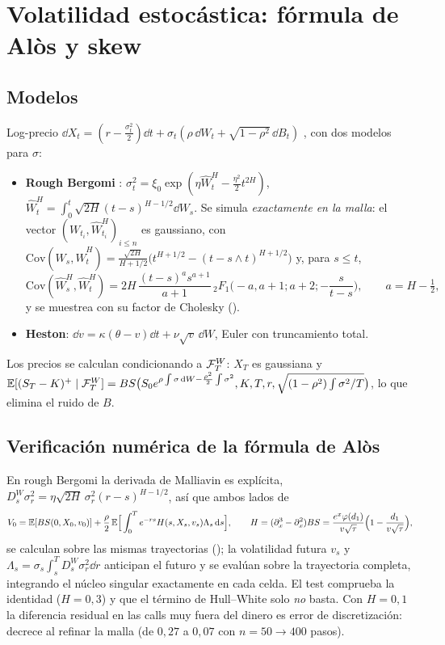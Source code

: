 \chapter{Volatilidad estocástica: fórmula de Alòs y skew}\label{cap:vol-estocastica}

\section{Modelos}
Log-precio $\dd X_t=(r-\frac{\sigma_t^2}{2})\dd t+\sigma_t(\rho\,\dd W_t+\sqrt{1-\rho^2}\,\dd B_t)$
, con dos modelos para $\sigma$:
\begin{itemize}
  \item \textbf{Rough Bergomi} : $\sigma_t^2=\xi_0\exp(\eta\hat W^H_t-\frac{\eta^2}{2}t^{2H})$,
  $\hat W^H_t=\int_0^t\sqrt{2H}(t-s)^{H-1/2}\dd W_s$. Se simula \emph{exactamente en la malla}: el vector
  $(W_{t_i},\hat W^H_{t_i})_{i\le n}$ es gaussiano, con
  $\mathrm{Cov}(W_s,\hat W^H_t)=\frac{\sqrt{2H}}{H+1/2}\big(t^{H+1/2}-(t-s\wedge t)^{H+1/2}\big)$ y, para $s\le t$,
  \[
    \mathrm{Cov}(\hat W^H_s,\hat W^H_t)=2H\,\frac{(t-s)^{a}s^{a+1}}{a+1}\,{}_2F_1\Big(-a,a+1;a+2;-\frac{s}{t-s}\Big),\qquad a=H-\tfrac12,
  \]
  y se muestrea con su factor de Cholesky ().
  \item \textbf{Heston}: $\dd v=\kappa(\theta-v)\dd t+\nu\sqrt v\,\dd W$, Euler con truncamiento total.
\end{itemize}
Los precios se calculan condicionando a $\mathcal{F}^W_T$: $X_T$ es gaussiana y
$\mathbb{E}[(S_T-K)^+\mid\mathcal{F}^W_T]=BS\big(S_0e^{\rho\int\sigma\,\mathrm{d} W-\frac{\rho^2}{2}\int\sigma^2},K,T,r,\sqrt{(1-\rho^2)\int\sigma^2/T}\big)$,
lo que elimina el ruido de $B$.

\section{Verificación numérica de la fórmula de Alòs }
En rough Bergomi la derivada de Malliavin es explícita,
$D^W_s\sigma_r^2=\eta\sqrt{2H}\,\sigma_r^2(r-s)^{H-1/2}$, así que ambos lados de
\[
  V_0=\mathbb{E}[BS(0,X_0,v_0)]+\frac\rho2\,\mathbb{E}\Big[\int_0^Te^{-rs}H(s,X_s,v_s)\Lambda_s\,\mathrm{d} s\Big],\qquad
  H=(\partial_x^3-\partial_x^2)BS=\frac{e^x\varphi(d_1)}{v\sqrt\tau}\Big(1-\frac{d_1}{v\sqrt\tau}\Big),
\]
se calculan sobre las mismas trayectorias (); la
volatilidad futura $v_s$ y $\Lambda_s=\sigma_s\int_s^TD^W_s\sigma_r^2\dd r$ anticipan el futuro y se
evalúan sobre la trayectoria completa, integrando el núcleo singular exactamente en cada celda.
El test comprueba la identidad ($H=0{,}3$) y que el término de Hull--White solo \emph{no} basta.
Con $H=0{,}1$ la diferencia residual en las calls muy fuera del dinero es error de
discretización: decrece al refinar la malla (de $0{,}27$ a $0{,}07$ con $n=50\to400$ pasos).

